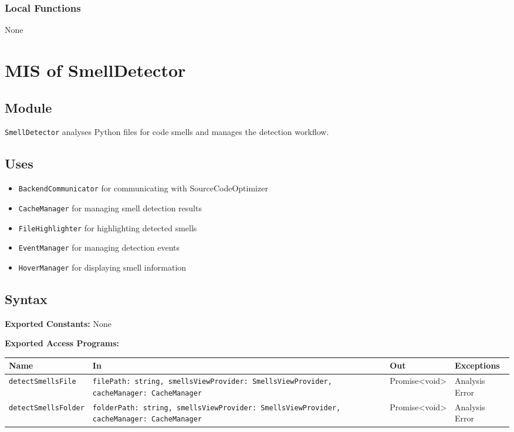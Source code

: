 \documentclass[12pt, titlepage]{article}
\begin{document}
\subsubsection{Local Functions}
None

\section{MIS of SmellDetector}

\subsection{Module}
\texttt{SmellDetector} analyses Python files for code smells and manages the detection workflow.

\subsection{Uses}
\begin{itemize}
\item \texttt{BackendCommunicator} for communicating with SourceCodeOptimizer
\item \texttt{CacheManager} for managing smell detection results
\item \texttt{FileHighlighter} for highlighting detected smells
\item \texttt{EventManager} for managing detection events
\item \texttt{HoverManager} for displaying smell information
\end{itemize}

\subsection{Syntax}

\textbf{Exported Constants:} None

\textbf{Exported Access Programs:}\\
\begin{tabularx}{\linewidth}{|l|>{\raggedright\arraybackslash}X|l|l|}
  \hline
  \textbf{Name} & \textbf{In} & \textbf{Out} & \textbf{Exceptions} \\
  \hline
  \texttt{detectSmellsFile} & \texttt{filePath: string, smellsViewProvider: SmellsViewProvider, cacheManager: CacheManager} & Promise<void> & Analysis Error \\
  \hline
  \texttt{detectSmellsFolder} & \texttt{folderPath: string, smellsViewProvider: SmellsViewProvider, cacheManager: CacheManager} & Promise<void> & Analysis Error \\
  \hline
\end{tabularx}
\end{document}
